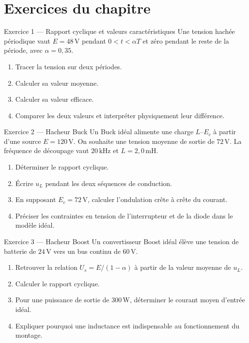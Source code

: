 
\section{Exercices du chapitre}\label{sec:ep-exercices}

\begin{TLExercise}{Exercice 1 — Rapport cyclique et valeurs caractéristiques}
Une tension hachée périodique vaut $E=48\,\mathrm V$ pendant $0<t<\alpha T$ et
zéro pendant le reste de la période, avec $\alpha=0{,}35$.
\begin{enumerate}
  \item Tracer la tension sur deux périodes.
  \item Calculer sa valeur moyenne.
  \item Calculer sa valeur efficace.
  \item Comparer les deux valeurs et interpréter physiquement leur différence.
\end{enumerate}
\end{TLExercise}

\begin{TLExercise}{Exercice 2 — Hacheur Buck}
Un Buck idéal alimente une charge $L$--$E_c$ à partir d'une source
$E=120\,\mathrm V$. On souhaite une tension moyenne de sortie de $72\,\mathrm V$.
La fréquence de découpage vaut $20\,\mathrm{kHz}$ et $L=2{,}0\,\mathrm{mH}$.
\begin{enumerate}
  \item Déterminer le rapport cyclique.
  \item Écrire $u_L$ pendant les deux séquences de conduction.
  \item En supposant $E_c=72\,\mathrm V$, calculer l'ondulation crête à crête du courant.
  \item Préciser les contraintes en tension de l'interrupteur et de la diode dans le modèle idéal.
\end{enumerate}
\end{TLExercise}

\begin{TLExercise}{Exercice 3 — Hacheur Boost}
Un convertisseur Boost idéal élève une tension de batterie de $24\,\mathrm V$ vers
un bus continu de $60\,\mathrm V$.
\begin{enumerate}
  \item Retrouver la relation $U_s=E/(1-\alpha)$ à partir de la valeur moyenne de $u_L$.
  \item Calculer le rapport cyclique.
  \item Pour une puissance de sortie de $300\,\mathrm W$, déterminer le courant moyen d'entrée idéal.
  \item Expliquer pourquoi une inductance est indispensable au fonctionnement du montage.
\end{enumerate}
\end{TLExercise}

